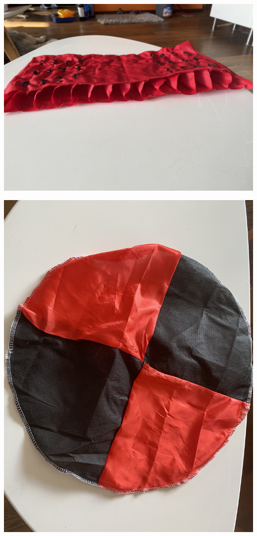 \documentclass[class=report, crop=false]{standalone}
\begin{document}
\includegraphics[width=\columnwidth]{ext/parachutefirst.png}

\includegraphics[width=\columnwidth]{ext/parachutesecond.png}

\vfill
\end{document}
